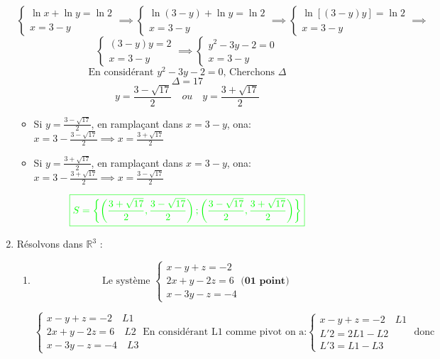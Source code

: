 \documentclass[12pt]{article}
\begin{document}
\begin{enumerate}
\[
\begin{cases}
\ln x + \ln y = \ln 2\\
x= 3-y 
\end{cases}\implies
\begin{cases}
\ln (3-y)  + \ln y = \ln 2\\
x= 3-y 
\end{cases}\implies
\begin{cases}
\ln\left[ (3-y)y\right]  = \ln 2\\
x= 3-y 
\end{cases}\implies
\]
\[
\begin{cases}
(3-y)y  = 2\\
x= 3-y 
\end{cases}\implies
\begin{cases}
y^{2}-3y-2 = 0\\
x= 3-y 
\end{cases}
\]
\[\text{En considérant } y^{2}-3y-2 = 0 \text{, Cherchons }\Delta \]
\[\Delta=17 \]
\[y=\frac{3-\sqrt{17}}{2}\quad ou \quad y=\frac{3+\sqrt{17}}{2} \]
\begin{itemize}
\item Si $y=\frac{3-\sqrt{17}}{2}$, en ramplaçant dans $x= 3-y $, ona: $x=3-\frac{3-\sqrt{17}}{2}\implies x=\frac{3+\sqrt{17}}{2}$
\item Si $y=\frac{3+\sqrt{17}}{2}$, en ramplaçant dans $x= 3-y $, ona: $x=3-\frac{3+\sqrt{17}}{2}\implies x=\frac{3-\sqrt{17}}{2}$
\end{itemize}
\[\textcolor{green}{\boxed{S=\left\lbrace \left(\frac{3+\sqrt{17}}{2}, \frac{3-\sqrt{17}}{2} \right);\left(\frac{3-\sqrt{17}}{2}, \frac{3+\sqrt{17}}{2}\right)   \right\rbrace }}\]
\item Résolvons dans $\mathbb{R}^{3}$ :
\begin{enumerate}
\item \[ \text{Le système }
\begin{cases}
x-y+z = -2\\
2x+y-2z = 6\\
x-3y-z=-4
\end{cases}  \textbf{(01 point)}
\]

\[
\begin{cases}
x-y+z = -2\quad L1\\
2x+y-2z = 6\quad L2\\
x-3y-z=-4\quad L3
\end{cases}\text{En considérant L1 comme pivot on a:}
\begin{cases}
x-y+z = -2\quad L1\\
L'2=2L1-L2\\
L'3=L1-L3
\end{cases}\text{ donc }
\]


\end{enumerate}
\end{enumerate}
\end{document}
